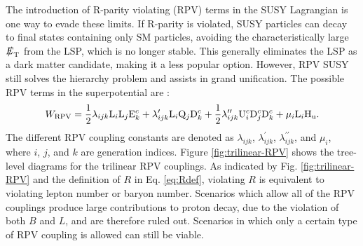 \documentclass[12pt]{thesis}  %
\providecommand{\PU}{\ensuremath{\cmsSymbolFace{U}}\xspace}
\providecommand{\PD}{\ensuremath{\cmsSymbolFace{D}}\xspace}
\providecommand{\PQ}{\ensuremath{\cmsSymbolFace{Q}}\xspace}
\providecommand{\PE}{\ensuremath{\cmsSymbolFace{E}}\xspace}
\providecommand{\PL}{\ensuremath{\cmsSymbolFace{L}}\xspace}
\def\eslash{\ensuremath{{\hbox{$E$\kern-0.6em\lower-.05ex\hbox{/}\kern0.10em}}}}
\def\met{\mbox{$\eslash_\text{T}$}\xspace} %
\begin{document}
The introduction of R-parity violating (RPV) terms in the SUSY Lagrangian is one way to evade these limits. If R-parity is violated, SUSY particles can decay to final states containing only SM particles, avoiding the characteristically large \met from the LSP, which is no longer stable. This generally eliminates the LSP as a dark matter candidate, making it a less popular option. However, RPV SUSY still solves the hierarchy problem and assists in grand unification. The possible RPV terms in the superpotential are \cite{Barbier}:
\begin{equation}
W_{\text{RPV}} = \frac{1}{2}\lambda_{ijk}\PL_{i}\PL_{j}\PE_{k}^{c} + \lambda_{ijk}^{\prime}\PL_{i}\PQ_{j}\PD_{k}^{c} + \frac{1}{2}\lambda_{ijk}^{\prime \prime}\PU_{i}^{c}\PD_{j}^{c}\PD_{k}^{c} + \mu_{i}\PL_{i}\Hone. \label{eq:WRPV}
\end{equation}
The different RPV coupling constants are denoted as $\lambda_{ijk}$, $\lambda^{\prime}_{ijk}$, $\lambda^{\prime \prime}_{ijk}$, and $\mu_{i}$, where $i$, $j$, and $k$ are generation indices. Figure \ref{fig:trilinear-RPV} shows the tree-level diagrams for the trilinear RPV couplings. As indicated by Fig. \ref{fig:trilinear-RPV} and the definition of $R$ in Eq. \eqref{eq:Rdef}, violating $R$ is equivalent to violating lepton number or baryon number. Scenarios which allow all of the RPV couplings produce large contributions to proton decay, due to the violation of both $B$ and $L$, and are therefore ruled out. Scenarios in which only a certain type of RPV coupling is allowed can still be viable.
\end{document}
